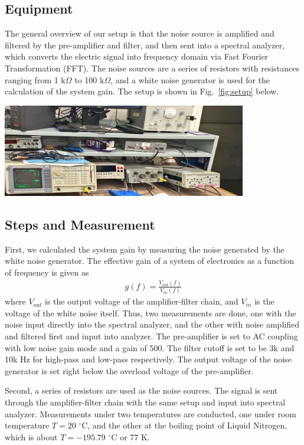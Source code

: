 \documentclass[12pt]{article}
\begin{document}
\subsection{Equipment}
\quad The general overview of our setup is that the noise source is amplified and filtered by the pre-amplifier and filter, and then sent into a spectral analyzer, which converts the electric signal into frequency domain via Fast Fourier Transformation (FFT). The noise sources are a series of resistors with resistances ranging from 1 k$\Omega$ to 100 k$\Omega$, and a white noise generator is used for the calculation of the system gain. The setup is shown in Fig.~\ref{fig:setup} below.
\begin{center}
    \includegraphics[width= 0.8\textwidth]{images/setup_photo.jpg}
    \label{fig:setup}
\end{center}


\subsection{Steps and Measurement}
\quad First, we calculated the system gain by measuring the noise generated by the white noise generator. The effective gain of a system of electronics as a function of frequency is given as
\begin{gather}
g(f)=\frac{V_{out}(f)}{V_{in}(f)}
\label{eqn:gain}
\end{gather}
where $V_{out}$ is the output voltage of the amplifier-filter chain, and $V_{in}$ is the voltage of the white noise itself. Thus, two measurements are done, one with the noise input directly into the spectral analyzer, and the other with noise amplified and filtered first and input into analyzer. The pre-amplifier is set to AC coupling with low noise gain mode and a gain of 500. The filter cutoff is set to be 3k and 10k Hz for high-pass and low-pass respectively. The output voltage of the noise generator is set right below the overload voltage of the pre-amplifier.

Second, a series of resistors are used as the noise sources. The signal is sent through the amplifier-filter chain with the same setup and input into spectral analyzer. Measurements under two temperatures are conducted, one under room temperature $T=20$ $^\circ$C, and the other at the boiling point of Liquid Nitrogen, which is about $T=-195.79$ $^\circ$C or 77 K.
\end{document}
